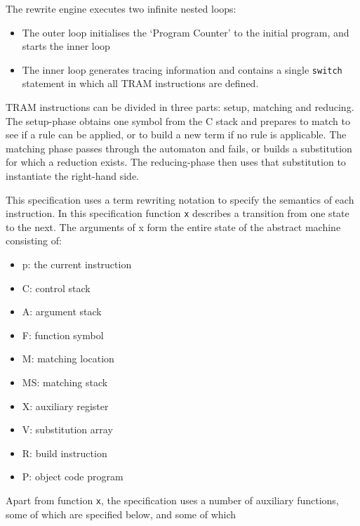 \documentclass[11pt,twoside]{memoir}
\def\T{\texttt}
\begin{document}
The rewrite engine executes two infinite nested loops:
\begin{itemize}
	\item The outer loop initialises the `Program Counter' to the initial program, and starts the inner loop
	\item The inner loop generates tracing information and contains a single \T{switch} statement in which all TRAM instructions are defined.
\end{itemize}

TRAM instructions can be divided in three parts: setup, matching and reducing. The setup-phase obtains one symbol from the C stack and prepares to match to see if a rule can be applied, or to build a new term if no rule is applicable. The matching phase passes through the automaton and fails, or builds a substitution for which a reduction exists. The reducing-phase then uses that substitution to instantiate the right-hand side.

This specification uses a term rewriting notation to specify the semantics of each instruction. In this specification function \T{x} describes a transition from one state to the next. The arguments of x form the entire state of the abstract machine consisting of:

\begin{itemize}[noitemsep]
	\item p: the current instruction
	\item C: control stack
	\item A: argument stack
	\item F: function symbol
	\item M: matching location
	\item MS: matching stack
	\item X: auxiliary register
	\item V: substitution array
	\item R: build instruction
	\item P: object code program
\end{itemize}

Apart from function \T{x}, the specification uses a number of auxiliary functions, some of which are specified below, and some of which 
\end{document}
